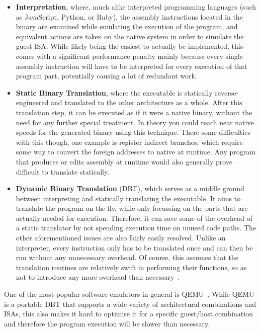 \begin{itemize}
    \item \textbf{Interpretation}, where, much alike interpreted programming languages (such as JavaScript, Python, or Ruby), the assembly instructions located in the binary are examined while emulating the execution of the program, and equivalent actions are taken on the native system in order to simulate the guest ISA\@.
        \subitem While likely being the easiest to actually be implemented, this comes with a significant performance penalty mainly because every single assembly instruction will have to be interpreted for every execution of that program part, potentially causing a lot of redundant work.
    \item \textbf{Static Binary Translation}, where the executable is statically reverse-engineered and translated to the other architecture as a whole.
    After this translation step, it can be executed as if it were a native binary, without the need for any further special treatment.
    In theory you could reach near native speeds for the generated binary using this technique.
    There some difficulties with this though, one example is register indirect branches, which require some way to convert the foreign addresses to native at runtime.
    Any program that produces or edits assembly at runtime would also generally prove difficult to translate statically.
    \item \textbf{Dynamic Binary Translation} (DBT), which serves as a middle ground between interpreting and statically translating the executable.
    It aims to translate the program on the fly, while only focussing on the parts that are actually needed for execution.
    Therefore, it can save some of the overhead of a static translator by not spending execution time on unused code paths.
    The other aforementioned issues are also fairly easily resolved.
    Unlike an interpreter, every instruction only has to be translated once and can then be run without any unnecessary overhead.
    Of course, this assumes that the translation routines are relatively swift in performing their functions, so as not to introduce any more overhead than necessary~\cite[S. 1f.]{bintrans}.
\end{itemize}

One of the most popular software emulators in general is QEMU~\cite{bellard2005qemu}\@.
While QEMU is a portable DBT that supports a wide variety of architectural combinations and ISAs, this also makes it hard to optimise it for a specific guest/host combination and therefore the program execution will be slower than necessary.

